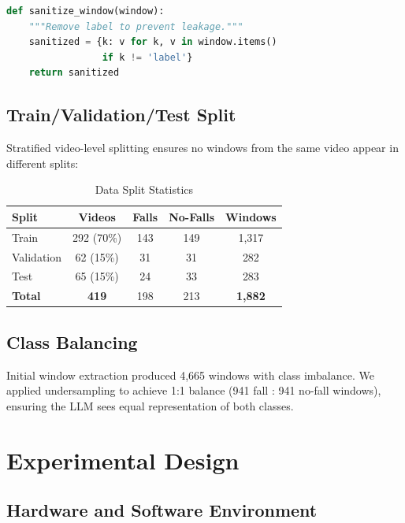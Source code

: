 \documentclass[conference]{IEEEtran}
\begin{document}
\begin{lstlisting}[language=Python]
def sanitize_window(window):
    """Remove label to prevent leakage."""
    sanitized = {k: v for k, v in window.items() 
                 if k != 'label'}
    return sanitized
\end{lstlisting}

\subsection{Train/Validation/Test Split}

Stratified video-level splitting ensures no windows from the same video appear in different splits:

\begin{table}[H]
\centering
\caption{Data Split Statistics}
\label{tab:splits}
\begin{tabular}{lcccc}
\toprule
\textbf{Split} & \textbf{Videos} & \textbf{Falls} & \textbf{No-Falls} & \textbf{Windows} \\
\midrule
Train & 292 (70\%) & 143 & 149 & 1,317 \\
Validation & 62 (15\%) & 31 & 31 & 282 \\
Test & 65 (15\%) & 24 & 33 & 283 \\
\midrule
\textbf{Total} & \textbf{419} & 198 & 213 & \textbf{1,882} \\
\bottomrule
\end{tabular}
\end{table}

\subsection{Class Balancing}

Initial window extraction produced 4,665 windows with class imbalance. We applied undersampling to achieve 1:1 balance (941 fall : 941 no-fall windows), ensuring the LLM sees equal representation of both classes.

\section{Experimental Design}

\subsection{Hardware and Software Environment}
\end{document}
